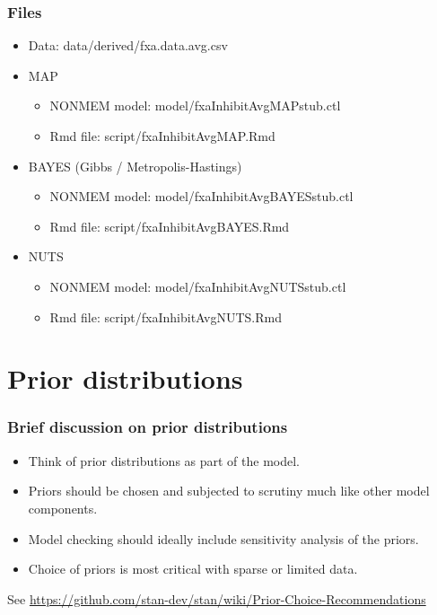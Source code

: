 \documentclass{beamer}
\begin{document}
\begin{frame}
  \frametitle{Files}
  
  \begin{itemize}
  \item Data: data/derived/fxa.data.avg.csv
  \item MAP
    \begin{itemize}
    \item NONMEM model: model/fxaInhibitAvgMAPstub.ctl
    \item Rmd file: script/fxaInhibitAvgMAP.Rmd
    \end{itemize}
  \item BAYES (Gibbs / Metropolis-Hastings)
    \begin{itemize}
    \item NONMEM model: model/fxaInhibitAvgBAYESstub.ctl
    \item Rmd file: script/fxaInhibitAvgBAYES.Rmd
    \end{itemize}
  \item NUTS
    \begin{itemize}
    \item NONMEM model: model/fxaInhibitAvgNUTSstub.ctl
    \item Rmd file: script/fxaInhibitAvgNUTS.Rmd
    \end{itemize}
  \end{itemize}

\end{frame}

\section{Prior distributions}

\begin{frame}
  \frametitle{Brief discussion on prior distributions}

  \begin{itemize}
  \item Think of prior distributions as part of the model.
\item Priors should be chosen and 
subjected to scrutiny much like other model components.
\item Model checking should ideally include sensitivity analysis of
  the priors.
\item Choice of priors is most critical with sparse or limited data.
  \end{itemize}

See \url{https://github.com/stan-dev/stan/wiki/Prior-Choice-Recommendations}

\end{frame}
\end{document}
